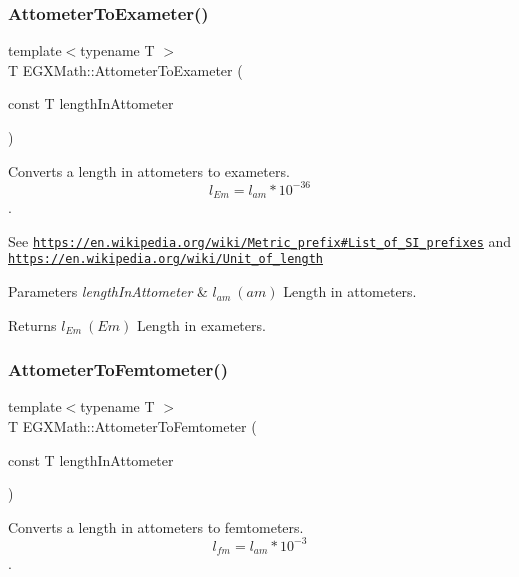 \subsubsection{\texorpdfstring{Attometer\+To\+Exameter()}{AttometerToExameter()}}
{\footnotesize\ttfamily template$<$typename T $>$ \\
T E\+G\+X\+Math\+::\+Attometer\+To\+Exameter (\begin{DoxyParamCaption}\item[{const T}]{length\+In\+Attometer }\end{DoxyParamCaption})}



Converts a length in attometers to exameters. \[ l_{Em}=l_{am} * 10^{-36} \]. 

See \href{https://en.wikipedia.org/wiki/Metric_prefix#List_of_SI_prefixes}{\tt https\+://en.\+wikipedia.\+org/wiki/\+Metric\+\_\+prefix\#\+List\+\_\+of\+\_\+\+S\+I\+\_\+prefixes} and \href{https://en.wikipedia.org/wiki/Unit_of_length}{\tt https\+://en.\+wikipedia.\+org/wiki/\+Unit\+\_\+of\+\_\+length} 
\begin{DoxyParams}{Parameters}
{\em length\+In\+Attometer} & $ l_{am}\ (am)$ Length in attometers. \\
\hline
\end{DoxyParams}
\begin{DoxyReturn}{Returns}
$ l_{Em}\ (Em)$ Length in exameters. 
\end{DoxyReturn}
\mbox{\label{group___e_g_x_math-_conversions-_length_conversions-_s_i-_attometer-_s_i_gafbaa622bc31794c382e244942fa1d445}} 
\subsubsection{\texorpdfstring{Attometer\+To\+Femtometer()}{AttometerToFemtometer()}}
{\footnotesize\ttfamily template$<$typename T $>$ \\
T E\+G\+X\+Math\+::\+Attometer\+To\+Femtometer (\begin{DoxyParamCaption}\item[{const T}]{length\+In\+Attometer }\end{DoxyParamCaption})}



Converts a length in attometers to femtometers. \[ l_{fm}=l_{am} * 10^{-3} \]. 

